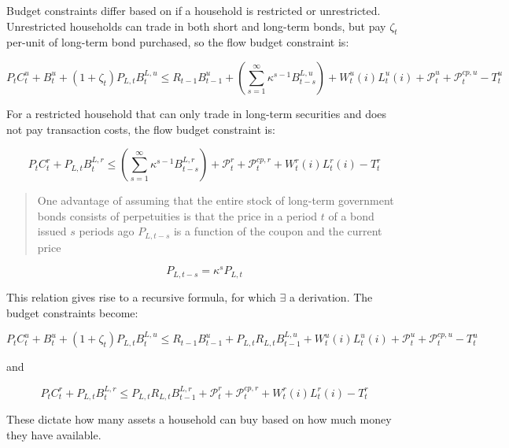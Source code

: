 \documentclass[notitlepage,12pt]{report}
\begin{document}
\begin{appendices}
	Budget constraints differ based on if a household is restricted or unrestricted. Unrestricted households can trade in both short and long-term bonds, but pay \(\zeta_t\) per-unit of long-term bond purchased, so the flow budget constraint is:
	
	\begin{equation}
	P_tC_t^u+B_t^u+(1+\zeta_t)P_{L,t}B_t^{L,u}\leq R_{t-1}B_{t-1}^u+\left(\sum_{s=1}^\infty\kappa^{s-1}B_{t-s}^{L,u}\right)+W_t^u(i)L_t^u(i)+\mathcal{P}_t^u+\mathcal{P}_t^{cp,u}-T_t^u
	\end{equation}
	
	For a restricted household that can only trade in long-term securities and does not pay transaction costs, the flow budget constraint is:
	
	\begin{equation}
	P_tC_t^r+P_{L,t}B_t^{L,r}\leq\left(\sum_{s=1}^\infty\kappa^{s-1}B_{t-s}^{L,r}\right)+\mathcal{P}_t^r+\mathcal{P}_t^{cp,r}+W_t^r(i)L_t^r(i)-T_t^r
	\end{equation}
	
	\begin{quote}
		One advantage of assuming that the entire stock of long-term government bonds consists of perpetuities is that the price in a period \(t\) of a bond issued \(s\) periods ago \(P_{L,t-s}\) is a function of the coupon and the current price
	\end{quote}
	
	\begin{equation*}
	P_{L,t-s}=\kappa^sP_{L,t}
	\end{equation*}
	
	This relation gives rise to a recursive formula, for which \(\exists\) a derivation.\cite[Section A.4, p.8]{chen_technical_2011} The budget constraints become:
	
	\begin{equation}
	P_tC_t^u+B_t^u+(1+\zeta_t)P_{L,t}B_t^{L,u}\leq R_{t-1}B_{t-1}^u+P_{L,t}R_{L,t}B_{t-1}^{L,u}+W_t^u(i)L_t^u(i)+\mathcal{P}_t^u+\mathcal{P}_t^{cp,u}-T_t^u
	\end{equation}
	
	and
	
	\begin{equation}
	P_tC_t^r+P_{L,t}B_t^{L,r}\leq P_{L,t}R_{L,t}B_{t-1}^{L,r}+\mathcal{P}_t^r+\mathcal{P}_t^{cp,r}+W_t^r(i)L_t^r(i)-T_t^r
	\end{equation}
	
	These dictate how many assets a household can buy based on how much money they have available.
	

\end{appendices}
\end{document}
